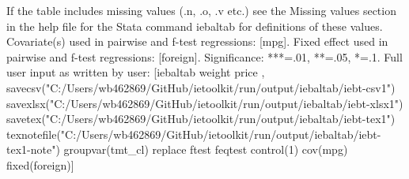 If the table includes missing values (.n, .o, .v etc.) see the Missing values section in the help file for the Stata command iebaltab for definitions of these values. Covariate(s) used in pairwise and f-test regressions: [mpg]. Fixed effect used in pairwise and f-test regressions: [foreign]. Significance: ***=.01, **=.05, *=.1. Full user input as written by user: [iebaltab weight price , savecsv("C:/Users/wb462869/GitHub/ietoolkit/run/output/iebaltab/iebt-csv1") savexlsx("C:/Users/wb462869/GitHub/ietoolkit/run/output/iebaltab/iebt-xlsx1") savetex("C:/Users/wb462869/GitHub/ietoolkit/run/output/iebaltab/iebt-tex1") texnotefile("C:/Users/wb462869/GitHub/ietoolkit/run/output/iebaltab/iebt-tex1-note") groupvar(tmt\_cl) replace ftest feqtest control(1) cov(mpg) fixed(foreign)] 
